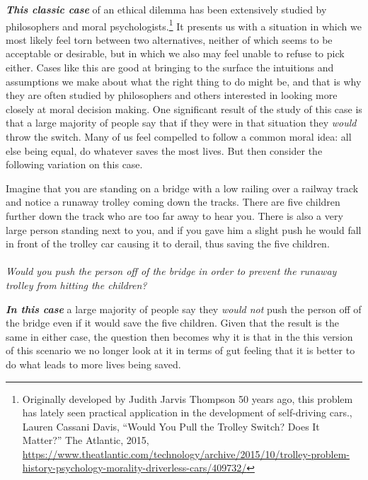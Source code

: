 \documentclass[12pt, openany]{book}
\makeatletter
\newenvironment{kframe}{%
\medskip{}
\setlength{\fboxsep}{.8em}
 \def\at@end@of@kframe{}%
 \ifinner\ifhmode%
  \def\at@end@of@kframe{\end{minipage}}%
  \begin{minipage}{\columnwidth}%
 \fi\fi%
 \def\FrameCommand##1{\hskip\@totalleftmargin \hskip-\fboxsep
 \colorbox{shadecolor}{##1}\hskip-\fboxsep
     \hskip-\linewidth \hskip-\@totalleftmargin \hskip\columnwidth}%
 \MakeFramed {\advance\hsize-\width
   \@totalleftmargin\z@ \linewidth\hsize
   \@setminipage}}%
 {\par\unskip\endMakeFramed%
 \at@end@of@kframe}
\newenvironment{rmdblock}[1]
  {
  \begin{itemize}
  \renewcommand{\labelitemi}{
    \raisebox{-.7\height}[0pt][0pt]{
      {\setkeys{Gin}{width=3em,keepaspectratio}\texttt{[image: img/\#1]}}
    }
  }
  \setlength{\fboxsep}{1em}
  \begin{kframe}
  \item
  }
  {
  \end{kframe}
  \end{itemize}
  }
\newenvironment{question}
  {\begin{rmdblock}{question}}
  {\end{rmdblock}}
\makeatother
\begin{document}
\textbf{\emph{This classic case}} of an ethical dilemma has been extensively studied by philosophers and moral psychologists.\footnote{Originally developed by Judith Jarvis Thompson 50 years ago, this problem has lately seen practical application in the development of self-driving cars., Lauren Cassani Davis, ``Would You Pull the Trolley Switch? Does It Matter?'' The Atlantic, 2015, \url{https://www.theatlantic.com/technology/archive/2015/10/trolley-problem-history-psychology-morality-driverless-cars/409732/}} It presents us with a situation in which we most likely feel torn between two alternatives, neither of which seems to be acceptable or desirable, but in which we also may feel unable to refuse to pick either. Cases like this are good at bringing to the surface the intuitions and assumptions we make about what the right thing to do might be, and that is why they are often studied by philosophers and others interested in looking more closely at moral decision making. One significant result of the study of this case is that a large majority of people say that if they were in that situation they \emph{would} throw the switch. Many of us feel compelled to follow a common moral idea: all else being equal, do whatever saves the most lives. But then consider the following variation on this case.

\begin{question}

Imagine that you are standing on a bridge with a low railing over a railway track and notice a runaway trolley coming down the tracks. There are five children further down the track who are too far away to hear you. There is also a very large person standing next to you, and if you gave him a slight push he would fall in front of the trolley car causing it to derail, thus saving the five children.\\
~\\
\emph{Would you push the person off of the bridge in order to prevent the runaway trolley from hitting the children?}

\end{question}

\textbf{\emph{In this case}} a large majority of people say they \emph{would not} push the person off of the bridge even if it would save the five children. Given that the result is the same in either case, the question then becomes why it is that in the this version of this scenario we no longer look at it in terms of gut feeling that it is better to do what leads to more lives being saved.
\end{document}

